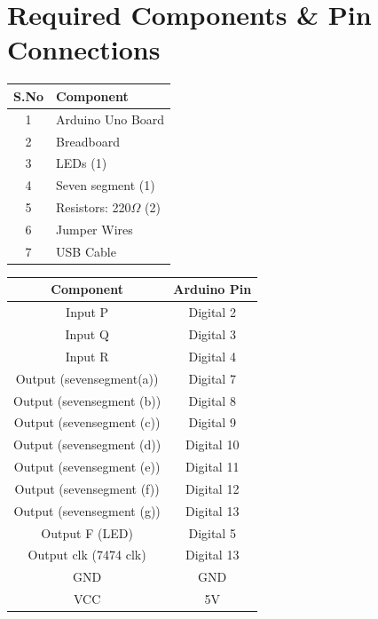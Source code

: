 \documentclass[a4paper,12pt]{article}
\begin{document}
\section*{Required Components \& Pin Connections}
\begin{center}
\begin{minipage}{0.45\textwidth}
\begin{table}[H]
\centering
\begin{tabular}{|c|l|}
\hline
\textbf{S.No} & \textbf{Component} \\ \hline
1 & Arduino Uno Board \\
2 & Breadboard  \\
3 & LEDs (1) \\
4 & Seven segment (1) \\
5 & Resistors: 220$\Omega$ (2) \\
6 & Jumper Wires \\
7 & USB Cable \\
\hline
\end{tabular}
\end{table}
\end{minipage}
\hspace{0.05\textwidth}
\begin{minipage}{0.45\textwidth}
\begin{table}[H]
\centering
\begin{tabular}{|c|c|}
\hline
\textbf{Component} & \textbf{Arduino Pin} \\ \hline
Input P  & Digital 2 \\
Input Q  & Digital 3 \\
Input R  & Digital 4 \\
Output (sevensegment(a))  & Digital 7 \\
Output (sevensegment (b)) & Digital 8 \\
Output (sevensegment (c)) & Digital 9 \\
Output (sevensegment (d)) & Digital 10 \\
Output (sevensegment (e)) & Digital 11 \\
Output (sevensegment (f)) & Digital 12\\
Output (sevensegment (g)) & Digital 13 \\
Output F (LED) & Digital 5 \\
Output clk (7474 clk) & Digital 13 \\
GND & GND \\
VCC & 5V \\
\hline
\end{tabular}
\end{table}
\end{minipage}
\end{center}
\end{document}
